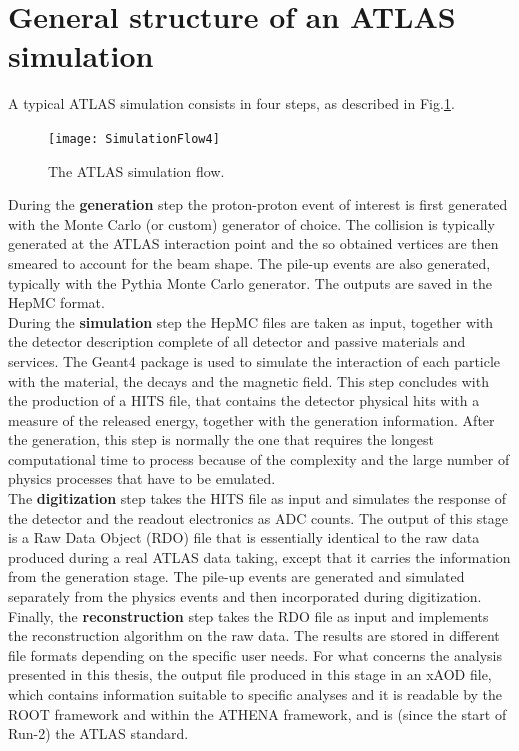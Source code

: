 \documentclass[a4paper,twoside,12pt]{book}
\begin{document}
\section{General structure of an ATLAS simulation}
A typical ATLAS simulation consists in four steps, as described in Fig.\ref{fig:simulationFlow}.

\begin{figure} [h]
	\texttt{[image: SimulationFlow4]}
	\caption{The ATLAS simulation flow. }
	\label{fig:simulationFlow}
\end{figure}

During the \textbf{generation} step the proton-proton event of interest is first generated with the Monte
Carlo (or custom) generator of choice. The collision is typically generated at the ATLAS 
interaction point and the so obtained vertices are then smeared to account for the beam 
shape. The pile-up events are also generated, typically with the Pythia Monte Carlo generator. The outputs are saved in the HepMC format. \\

During the \textbf{simulation} step the HepMC files are taken as input, together with
the detector description complete of all detector and passive materials and services. 
The Geant4 package\cite{Geant4} is used to simulate the interaction of each particle with the material, the decays and the
magnetic field. This
step concludes with the production of a HITS file, that contains the detector physical hits
with a measure of the released energy, together with the generation information. After
the generation, this step 
is normally the one that requires the longest computational time to process because of the
complexity and the large number of physics processes that have to be emulated.\\

The \textbf{digitization} step takes the HITS file as input and simulates the response of the 
detector and the readout electronics as ADC counts. The output of this stage is a Raw Data
Object (RDO) file that is essentially identical to the raw data produced during a real 
ATLAS data taking, except that it carries the information from the generation stage. The pile-up
events are generated and simulated separately from the physics events and then incorporated during digitization.\\

Finally, the \textbf{reconstruction} step takes the RDO file as input and implements
the reconstruction algorithm on the raw data. The results are stored in different file formats
depending on the specific user needs\cite{ATLASFormats}. For what concerns the analysis presented in this thesis,
the output file produced in this stage in an xAOD file, which contains information suitable to specific analyses and it is readable by the ROOT framework\cite {ROOT} and 
within the ATHENA framework\cite{Athena}, and is (since the start of Run-2) the ATLAS standard. \\
\end{document}
